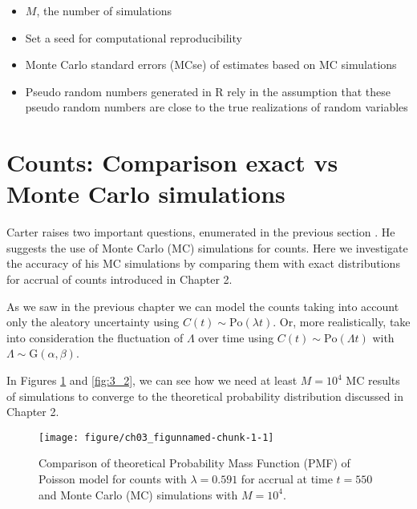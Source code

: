 \begin{itemize}
\item $M$, the number of simulations
\item Set a seed for computational reproducibility
\item Monte Carlo standard errors (MCse) of estimates based on MC simulations
\item Pseudo random numbers generated in R rely in the assumption that these pseudo random numbers are close to the true realizations of random variables \citep{held2014applied}
\end{itemize}
\section{Counts: Comparison exact vs Monte Carlo simulations}

Carter raises two important questions, enumerated in the previous section \citep{carter2004application, carter2005practical}. He suggests the use of Monte Carlo (MC) simulations for counts. Here we investigate the accuracy of his MC simulations by comparing them with exact distributions for accrual of counts introduced in Chapter 2.

As we saw in the previous chapter we can model the counts taking into account only the aleatory uncertainty using $C(t)\sim \textrm{Po}(\lambda t)$. Or, more realistically, take into consideration the fluctuation of $\Lambda$ over time using $C(t)\sim \textrm{Po}(\Lambda t)$ with $\Lambda\sim \textrm{G}(\alpha, \beta)$.

In Figures \ref{fig:3_1} and \ref{fig:3_2}, we can see how we need at least $M=10^4$ MC results of simulations to converge to the theoretical probability distribution discussed in Chapter 2.



% 
% 
% 
% 
% 
% 

\begin{figure}
\begin{knitrout}
\color{fgcolor}
\texttt{[image: figure/ch03\_figunnamed-chunk-1-1]} 
\end{knitrout}
  \caption{Comparison of theoretical Probability Mass Function (PMF) of Poisson model for counts with $\lambda = 0.591$ for accrual at time $t=550$ and Monte Carlo (MC) simulations with $M=10^4$.}
  \label{fig:3_1}
\end{figure}



